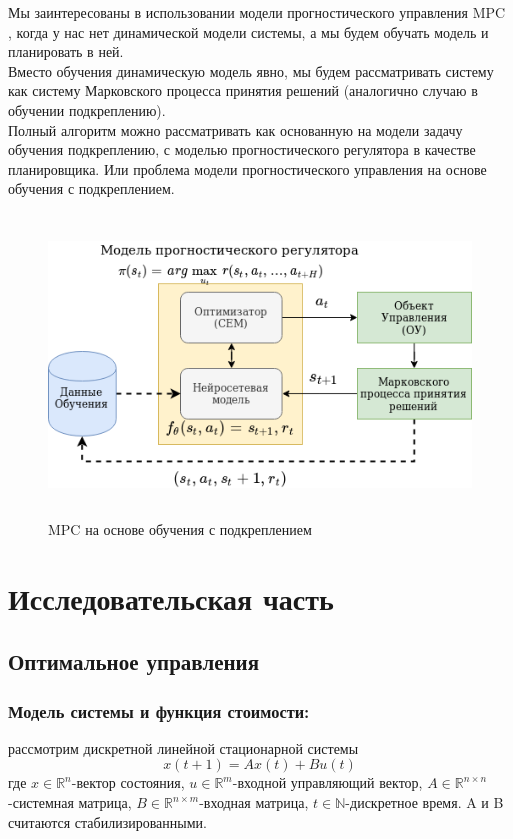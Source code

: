\documentclass[a4paper,12pt]{article}
\begin{document}
Мы заинтересованы в использовании модели прогностического управления MPC , когда у нас нет динамической модели системы, а мы будем обучать модель и планировать в ней.\\

Вместо обучения динамическую модель явно, мы будем рассматривать систему как систему Марковского процесса принятия решений (аналогично случаю в обучении подкреплению).\\

Полный алгоритм можно рассматривать как основанную на модели задачу обучения подкреплению, с моделью прогностического регулятора в качестве планировщика. Или проблема модели прогностического управления на основе обучения с подкреплением.\\

\begin{figure}[H]
    \centering
    \includegraphics[height=8cm]{img/MPC_ru.png}
    \caption{MPC на основе обучения с подкреплением}
    \label{fig:my_label}
\end{figure}
\newpage
\section{Исследовательская часть} 
\subsection{Оптимальное управления}
\subsubsection{Модель системы и функция стоимости:}
рассмотрим дискретной линейной стационарной системы
\begin{equation}
    x(t+1)=Ax(t)+Bu(t)
\end{equation}
где $x \in \mathbb{R}^n$-вектор состояния, $u \in \mathbb{R}^m$-входной управляющий вектор, $A \in \mathbb{R}^{n \times n}$-системная матрица, $B \in \mathbb{R}^{n \times m}$-входная матрица, $t \in \mathbb{N}$-дискретное время. A и B считаются стабилизированными.\\
\end{document}
